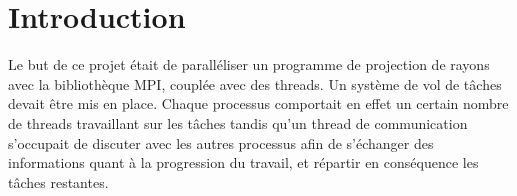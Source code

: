 \section{Introduction} %
\label{sec:introduction}
Le but de ce projet était de paralléliser un programme de projection de rayons avec la bibliothèque MPI, couplée avec des threads. Un système de vol de tâches devait être mis en place. Chaque processus comportait en effet un certain nombre de threads  travaillant sur les tâches tandis qu'un thread de communication s'occupait de discuter avec les autres processus afin de s'échanger des informations quant à la progression du travail, et répartir en conséquence les tâches restantes. 

